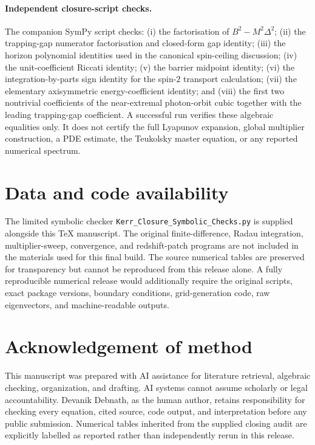 \documentclass[11pt,a4paper]{article}
\theoremstyle{remark}
\theoremstyle{definition}
\begin{document}
\paragraph{Independent closure-script checks.} The companion SymPy script checks: (i) the factorisation of $B^2-M^2\Delta^2$; (ii) the trapping-gap numerator factorisation and closed-form gap identity; (iii) the horizon polynomial identities used in the canonical spin-ceiling discussion; (iv) the unit-coefficient Riccati identity; (v) the barrier midpoint identity; (vi) the integration-by-parts sign identity for the spin-$2$ transport calculation; (vii) the elementary axisymmetric energy-coefficient identity; and (viii) the first two nontrivial coefficients of the near-extremal photon-orbit cubic together with the leading trapping-gap coefficient. A successful run verifies these algebraic equalities only. It does not certify the full Lyapunov expansion, global multiplier construction, a PDE estimate, the Teukolsky master equation, or any reported numerical spectrum.

\section*{Data and code availability}

The limited symbolic checker \texttt{Kerr\_Closure\_Symbolic\_Checks.py} is supplied alongside this TeX manuscript. The original finite-difference, Radau integration, multiplier-sweep, convergence, and redshift-patch programs are not included in the materials used for this final build. The source numerical tables are preserved for transparency but cannot be reproduced from this release alone. A fully reproducible numerical release would additionally require the original scripts, exact package versions, boundary conditions, grid-generation code, raw eigenvectors, and machine-readable outputs.

\section*{Acknowledgement of method}

This manuscript was prepared with AI assistance for literature retrieval, algebraic checking, organization, and drafting. AI systems cannot assume scholarly or legal accountability. Devanik Debnath, as the human author, retains responsibility for checking every equation, cited source, code output, and interpretation before any public submission. Numerical tables inherited from the supplied closing audit are explicitly labelled as reported rather than independently rerun in this release.
\end{document}
